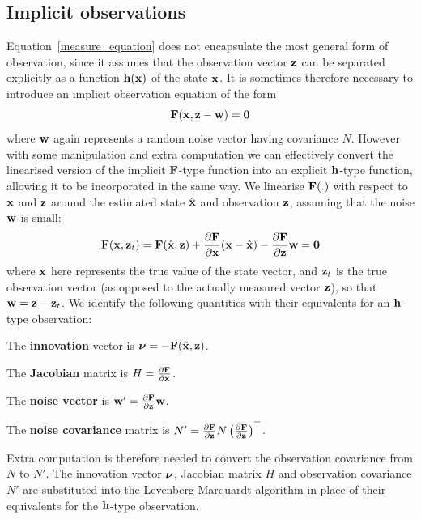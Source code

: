 \documentclass{article}
\begin{document}
\subsection{Implicit observations}
Equation~\ref{measure_equation} does not encapsulate the most general
form of observation, since it assumes that the observation vector ${\bf z}$
can be separated explicitly as a function ${\bf h}({\bf x})$ of the state ${\bf x}$.
It is sometimes therefore necessary to introduce an implicit observation
equation of the form
\[ {\bf F}({\bf x},{\bf z}-{\bf w}) = {\bf 0}
\]
where ${\bf w}$ again represents a random noise vector having covariance $N$.
However with some manipulation and extra computation we can effectively
convert the linearised version of the implicit ${\bf F}$-type function into an
explicit ${\bf h}$-type function, allowing it to be incorporated in the same way.
We linearise ${\bf F}(.)$ with respect to ${\bf x}$ and ${\bf z}$ around the
estimated state $\hat{\bf x}$ and observation ${\bf z}$, assuming
that the noise ${\bf w}$ is small:
\[ {\bf F}({\bf x},{\bf z}_t) = {\bf F}(\hat{\bf x},{\bf z})
	+ \frac{\partial {\bf F}}{\partial {\bf x}} ({\bf x}-\hat{\bf x})
	- \frac{\partial {\bf F}}{\partial {\bf z}} {\bf w} = {\bf 0}
\]
where ${\bf x}$ here represents the true value of the state vector, and ${\bf z}_t$
is the true observation vector (as opposed to the actually measured vector
${\bf z}$), so that ${\bf w} = {\bf z}-{\bf z}_t$.
We identify the following quantities with their equivalents for an ${\bf h}$-type
observation:
\begin{description}
  \item{The {\bf innovation}} vector is $\mbox{\boldmath $\nu$}=-{\bf F}(\hat{\bf x},{\bf z})$.
  \item{The {\bf Jacobian}} matrix is
	$H=\frac{\partial {\bf F}}{\partial {\bf x}}$.
  \item{The {\bf noise vector}} is
	${\bf w}' = \frac{\partial {\bf F}}{\partial {\bf z}} {\bf w}$.
  \item{The {\bf noise covariance}} matrix is
	$N' = \frac{\partial {\bf F}}{\partial {\bf z}} N \left(\frac{\partial {\bf F}}{\partial {\bf z}}\right)^{\top}$.
\end{description}
Extra computation is therefore needed to convert the observation covariance
from $N$ to $N'$. The innovation vector $\mbox{\boldmath $\nu$}$, Jacobian matrix $H$ and
observation covariance $N'$ are substituted into the Levenberg-Marquardt
algorithm in place of their equivalents for the ${\bf h}$-type observation.



\end{document}
